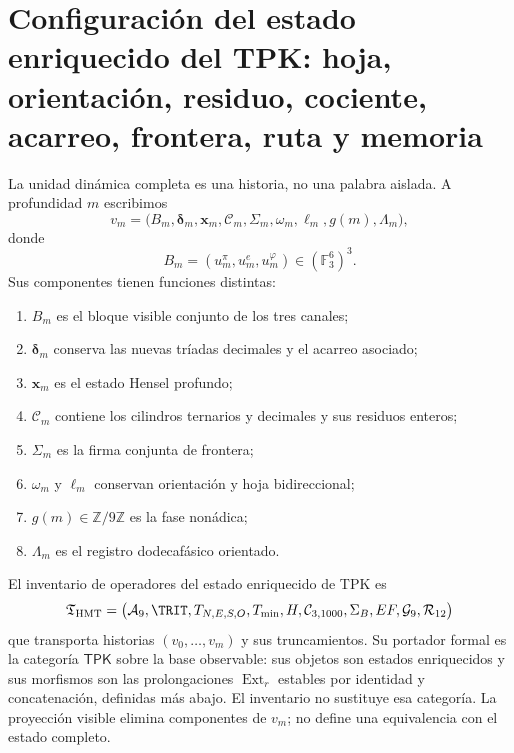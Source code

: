 \section{Configuración del estado enriquecido del TPK: hoja, orientación, residuo, cociente, acarreo, frontera, ruta y memoria}

La unidad din\'amica completa es una historia, no una palabra aislada. A
profundidad \(m\) escribimos
\[
 v_m=
 \bigl(
 B_m,\boldsymbol\delta_m,\boldsymbol x_m,
 \boldsymbol{\mathcal C}_m,\Sigma_m,
 \omega_m,\ell_m,g(m),\Lambda_m
 \bigr),
\]
donde
\[
 B_m=(u_m^\pi,u_m^e,u_m^\varphi)\in(\mathbb F_3^6)^3.
\]
Sus componentes tienen funciones distintas:
\begin{enumerate}
 \item \(B_m\) es el bloque visible conjunto de los tres canales;
 \item \(\boldsymbol\delta_m\) conserva las nuevas tr\'iadas decimales y el
       acarreo asociado;
 \item \(\boldsymbol x_m\) es el estado Hensel profundo;
 \item \(\boldsymbol{\mathcal C}_m\) contiene los cilindros ternarios y
       decimales y sus residuos enteros;
 \item \(\Sigma_m\) es la firma conjunta de frontera;
 \item \(\omega_m\) y \(\ell_m\) conservan orientaci\'on y hoja bidireccional;
 \item \(g(m)\in\mathbb Z/9\mathbb Z\) es la fase non\'adica;
 \item \(\Lambda_m\) es el registro dodecaf\'asico orientado.
\end{enumerate}

\begin{definition}
El inventario de operadores del estado enriquecido de TPK es
\[
 \mathfrak T_{\rm HMT}=
 \bigl(
 \mathcal A_9,\TRIT,T_{N,E,S,O},T_{\min},
 H,\mathcal C_{3,1000},\Sigma_B,EF,\mathcal G_9,
 \mathcal R_{12}
 \bigr)
\]
que transporta historias \((v_0,\ldots,v_m)\) y sus truncamientos. Su
portador formal es la categor\'ia \(\mathsf{TPK}\) sobre la base observable:
sus objetos son estados enriquecidos y sus morfismos son las prolongaciones
\(\operatorname{Ext}_r\) estables por identidad y concatenaci\'on, definidas
m\'as abajo. El inventario no sustituye esa categor\'ia. La proyecci\'on
visible elimina componentes de \(v_m\); no define una equivalencia con el
estado completo.
\end{definition}

